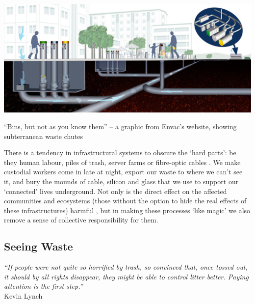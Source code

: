 \documentclass[nofonts,nols,justified,nobib]{tufte-book}
\begin{document}
\begin{marginfigure}
\includegraphics[width=\textwidth]{img/1/envac.jpg}
\caption{``Bins, but not as you know them'' -- a graphic from Envac's website, showing subterranean waste chutes \cite{envac_smart_nodate}}
\end{marginfigure}

There is a tendency in infrastructural systems to obscure the `hard parts': be they human labour, piles of trash, server farms or fibre-optic cables \cite{mattern_infrastructural_2013}. We make custodial workers come in late at night, export our waste to where we can't see it, and bury the mounds of cable, silicon and glass that we use to support our `connected' lives underground. Not only is the direct effect on the affected communities and ecosystems (those without the option to hide the real effects of these infrastructures) harmful \cite{liboiron_why_2014}, but in making these processes `like magic' we also remove a sense of collective responsibility for them.

\subsection*{Seeing Waste}

\begin{flushright}
\begin{minipage}[b]{0.8\textwidth}
\begin{flushright}
\emph{``If people were not quite so horrified by trash, so convinced that, 
once tossed out, it should by all rights disappear, they might be able to 
control litter better. Paying attention is the first step.''} \cite{lynch_wasting_1990} \\
Kevin Lynch
\end{flushright}
\end{minipage}
\end{flushright}
\end{document}
